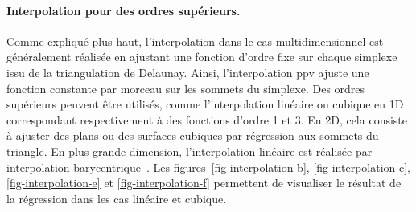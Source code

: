 \paragraph{Interpolation pour des ordres supérieurs.} Comme expliqué plus haut, l'interpolation dans le cas multidimensionnel est généralement réalisée en ajustant une fonction d'ordre fixe sur chaque simplexe issu de la triangulation de Delaunay. Ainsi, l'interpolation \gls{ppv} ajuste une fonction constante par morceau sur les sommets du simplexe. Des ordres supérieurs peuvent être utilisés, comme l'interpolation linéaire ou cubique en 1D correspondant respectivement à des fonctions d'ordre 1 et 3. En 2D, cela consiste à ajuster des plans ou des surfaces cubiques par régression aux sommets du triangle. En plus grande dimension, l'interpolation linéaire est réalisée par interpolation barycentrique~\cite{hormann2014barycentric}. Les figures~\ref{fig-interpolation-b}, \ref{fig-interpolation-c}, \ref{fig-interpolation-e} et \ref{fig-interpolation-f} permettent de visualiser le résultat de la régression dans les cas linéaire et cubique.
  
